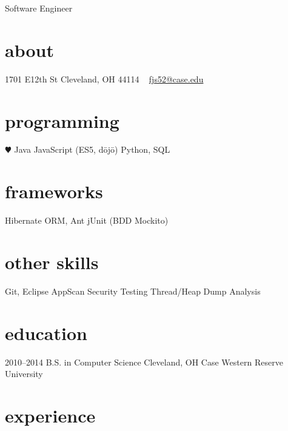 \documentclass[]{friggeri-cv}
\begin{document}
       {Software Engineer}


\begin{aside}
  \section{about}
    1701 E12th St
    Cleveland, OH
    44114
    ~
    \href{mailto:fjs52@case.edu}{fjs52@case.edu}
  \section{programming}
    {\color{red} $\varheartsuit$} Java
    JavaScript
    (ES5, d\={o}j\={o})
    Python, SQL
  \section{frameworks}
    Hibernate ORM, Ant
    jUnit (BDD Mockito)
  \section{other skills}
    Git, Eclipse
    AppScan Security Testing
    Thread/Heap Dump Analysis
\end{aside}

\section{education}

\begin{entrylist}
  \entry
    {2010–2014}
    {B.S. in Computer Science}
    {Cleveland, OH}
    {Case Western Reserve University}
\end{entrylist}

\section{experience}
\end{document}
